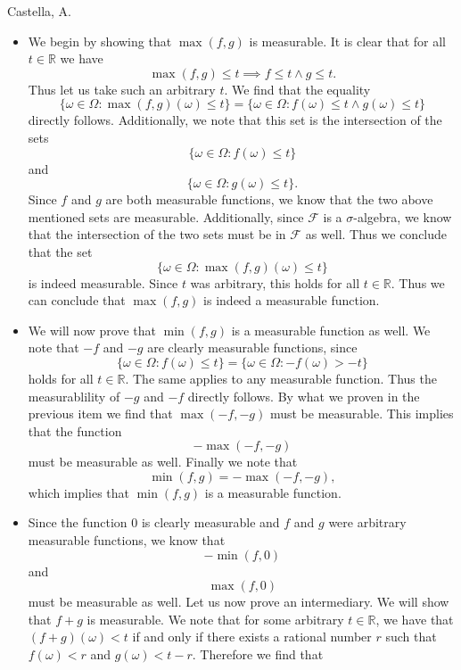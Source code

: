 \begin{solution}[5.4]{Castella, A.}
    \begin{itemize}
        \item We begin by showing that $\max(f,g)$ is measurable. It is clear that for all $t \in \mathbb{R}$ we have
        $$
            \max(f,g) \leq t \implies f \leq t \land g \leq t.
        $$
        Thus let us take such an arbitrary $t$. We find that the equality
        $$
            \{\omega \in \Omega : \max(f,g)(\omega) \leq t\} = \{\omega \in \Omega : f(\omega) \leq t \land g(\omega) \leq t\}
        $$
        directly follows. Additionally, we note that this set is the intersection of the sets
        $$
            \{\omega \in \Omega : f(\omega) \leq t\}
        $$
        and
        $$
            \{\omega \in \Omega : g(\omega) \leq t\}.
        $$
        Since $f$ and $g$ are both measurable functions, we know that the two above mentioned sets are measurable. Additionally, since $\mathcal{F}$ is a $\sigma$-algebra, we know that the intersection of the two sets must be in $\mathcal{F}$ as well. Thus we conclude that the set
        $$
            \{\omega \in \Omega : \max(f, g)(\omega) \leq t\}
        $$
        is indeed measurable. Since $t$ was arbitrary, this holds for all $t \in \mathbb{R}$. Thus we can conclude that $\max(f,g)$ is indeed a measurable function.
        \item We will now prove that $\min(f,g)$ is a measurable function as well. We note that $-f$ and $-g$ are clearly measurable functions, since
        $$
            \{\omega \in \Omega : f(\omega) \leq t\} = \{\omega \in \Omega : -f(\omega) > -t\}
        $$
        holds for all $t \in \mathbb{R}$. The same applies to any measurable function. Thus the measurablility of $-g$ and $-f$ directly follows. By what we proven in the previous item we find that $\max(-f, -g)$ must be measurable. This implies that the function
        $$
            -\max(-f,-g)
        $$
        must be measurable as well. Finally we note that
        $$
            \min(f,g) = -\max(-f,-g),
        $$
        which implies that $\min(f,g)$ is a measurable function.
        \item Since the function $0$ is clearly measurable and $f$ and $g$ were arbitrary measurable functions, we know that
        $$
            -\min(f,0)
        $$
        and
        $$
            \max(f,0)
        $$
        must be measurable as well. Let us now prove an intermediary. We will show that $f+g$ is measurable. We note that for some arbitrary $t \in \mathbb{R}$, we have that $(f+g)(\omega) < t$ if and only if there exists a rational number $r$ such that $f(\omega) < r$ and $g(\omega) < t-r$. Therefore we find that

\end{itemize}
\end{solution}
